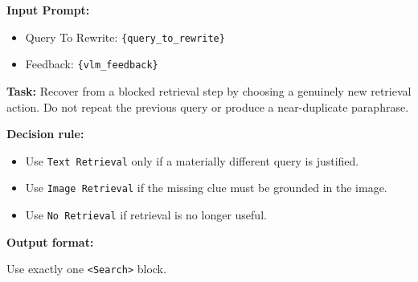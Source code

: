 \documentclass{article} %
\begin{document}
\begin{tcolorbox}[
  title=Example: Rewrite Similar Text Query Prompt,
  coltitle=black,
  colbacktitle=blue!8,
  colback=blue!5,
  colframe=black,
  fonttitle=\bfseries,
  arc=2mm,
  boxrule=0.5pt,
  enhanced jigsaw,
  breakable,
  width=\linewidth,
  left=6pt,
  right=6pt,
  top=6pt,
  bottom=6pt
]

\textbf{Input Prompt:}

\begin{itemize}
  \item Query To Rewrite: \texttt{\{query\_to\_rewrite\}}
  \item Feedback: \texttt{\{vlm\_feedback\}}
\end{itemize}

\textbf{Task:}
Recover from a blocked retrieval step by choosing a genuinely new retrieval action.
Do not repeat the previous query or produce a near-duplicate paraphrase.

\textbf{Decision rule:}
\begin{itemize}
  \item Use \texttt{Text Retrieval} only if a materially different query is justified.
  \item Use \texttt{Image Retrieval} if the missing clue must be grounded in the image.
  \item Use \texttt{No Retrieval} if retrieval is no longer useful.
\end{itemize}

\textbf{Output format:}

Use exactly one \texttt{<Search>} block.
\end{tcolorbox}
\newpage
\end{document}
